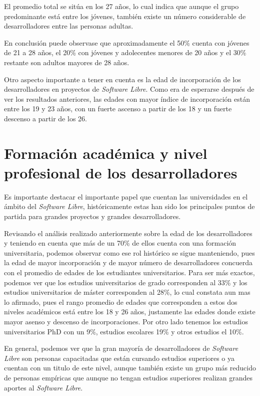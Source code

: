 El promedio total se sitúa en los 27 años, lo cual  indica que aunque el grupo predominante está entre los jóvenes, también existe un número considerable de desarrolladores entre las personas adultas. 

En conclusión puede observase que aproximadamente el 50\% cuenta con jóvenes de 21 a 28 años, el 20\% con jóvenes y adolecentes menores de 20 años y el 30\% restante son adultos mayores de 28 años.

Otro aspecto importante a tener en cuenta es la edad de incorporación de los desarrolladores en proyectos de \textit{Software Libre}. Como era de esperarse después de ver  los resultados anteriores, las edades con mayor índice de incorporación están entre los 19 y 23 años, con un fuerte  ascenso a partir de  los 18 y un fuerte descenso a partir de los 26.

\section{Formación académica y nivel profesional de los desarrolladores}

Es importante destacar el importante papel que cuentan las universidades en el ámbito del \textit{Software Libre}, históricamente estas han sido los principales puntos de partida para grandes proyectos y grandes desarrolladores. 

Revisando el análisis realizado anteriormente sobre la edad de los desarrolladores y teniendo en cuenta que más de un 70\% de ellos cuenta con una formación universitaria, podemos observar como ese rol histórico se sigue manteniendo, pues la edad de mayor incorporación y de mayor número de desarrolladores concuerda con el promedio de edades de los estudiantes universitarios.  Para ser más  exactos, podemos ver que los estudios universitarios de grado corresponden al 33\% y los estudios universitarios de máster corresponden al 28\%, lo cual constata aun mas lo afirmado, pues  el rango promedio de edades que corresponden a estos dos niveles académicos está entre los 18 y 26 años, justamente las edades donde existe mayor asenso y descenso de incorporaciones. Por otro lado tenemos los estudios universitarios PhD con un 9\%, estudios escolares 19\% y otros estudios el 10\%. 

En general, podemos ver que la gran mayoría de desarrolladores de \textit{Software Libre} son personas capacitadas que están cursando estudios superiores o ya cuentan con un titulo de este nivel, aunque también existe un grupo más reducido de personas empíricas que aunque no tengan estudios superiores realizan grandes aportes al \textit{Software Libre}.

